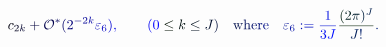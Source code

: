 \documentclass[12pt]{article}
\begin{document}
\makeatletter
\renewcommand*{\@textcolor}[3]{%
  \protect\leavevmode
  \begingroup
    \color#1{#2}#3%
  \endgroup
}
\makeatother
\begin{displaymath}
\mathcolor[RGB]{0,0,15}{c} _ { \mathcolor[RGB]{0,0,30}{2} \mathcolor[RGB]{0,0,45}{k} } \mathcolor[RGB]{0,0,60}{+} \mathcal { \mathcolor[RGB]{0,0,75}{O} } ^ { \mathcolor[RGB]{0,0,90}{*} } \mathcolor[RGB]{0,0,105}{(} \mathcolor[RGB]{0,0,120}{2} ^ { \mathcolor[RGB]{0,0,135}{-} \mathcolor[RGB]{0,0,150}{2} \mathcolor[RGB]{0,0,165}{k} } \mathcolor[RGB]{0,0,180}{\varepsilon} _ { \mathcolor[RGB]{0,0,195}{6} } \mathcolor[RGB]{0,0,210}{)} \mathcolor[RGB]{0,0,225}{,} \qquad \mathcolor[RGB]{0,0,240}{(} \mathcolor[RGB]{0,0,255}{0} \mathcolor[RGB]{0,15,0}{\leq} \mathcolor[RGB]{0,15,15}{k} \mathcolor[RGB]{0,15,30}{\leq} \mathcolor[RGB]{0,15,45}{J} \mathcolor[RGB]{0,15,60}{)} \quad \mathrm { \mathcolor[RGB]{0,15,75}{w} \mathcolor[RGB]{0,15,90}{h} \mathcolor[RGB]{0,15,105}{e} \mathcolor[RGB]{0,15,120}{r} \mathcolor[RGB]{0,15,135}{e} } \quad \mathcolor[RGB]{0,15,150}{\varepsilon} _ { \mathcolor[RGB]{0,15,165}{6} } \mathcolor[RGB]{0,15,180}{:} \mathcolor[RGB]{0,15,195}{=} \mathcolor[RGB]{0,15,210}{\frac { \mathcolor[RGB]{0,15,225}{1} } { \mathcolor[RGB]{0,15,240}{3} \mathcolor[RGB]{0,15,255}{J} } } \mathcolor[RGB]{0,30,0}{\frac { \mathcolor[RGB]{0,30,15}{(} \mathcolor[RGB]{0,30,30}{2} \mathcolor[RGB]{0,30,45}{\pi} \mathcolor[RGB]{0,30,60}{)} ^ { \mathcolor[RGB]{0,30,75}{J} } } { \mathcolor[RGB]{0,30,90}{J} \mathcolor[RGB]{0,30,105}{!} } } \mathcolor[RGB]{0,30,120}{.}
\end{displaymath}
\end{document}
